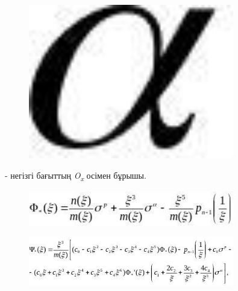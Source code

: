 \begin{figure}[H]
	\centering
	\includegraphics[width=0.8\textwidth]{assets/1286}
	\caption*{}
\end{figure} - негізгі бағыттың
\emph{O\textsubscript{x}} осімен бұрышы.

\begin{figure}[H]
	\centering
	\includegraphics[width=0.8\textwidth]{assets/1287}
	\caption*{}
\end{figure}

\begin{figure}[H]
	\centering
	\includegraphics[width=0.8\textwidth]{assets/1288}
	\caption*{}
\end{figure}


